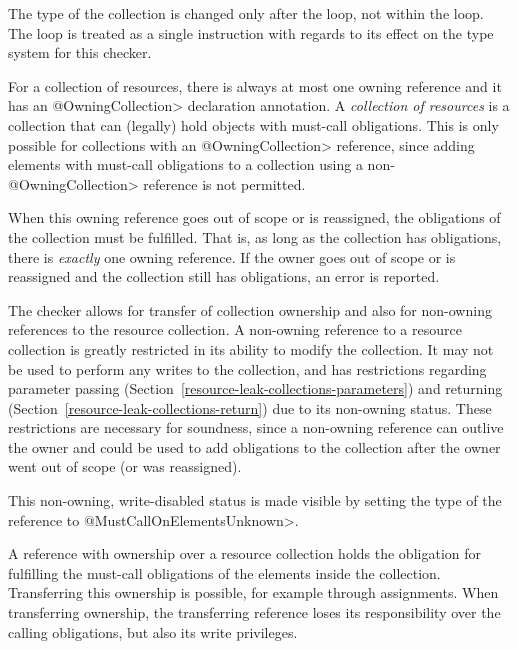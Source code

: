 The type of the collection is changed only after the loop, not within the
loop. The loop is treated as a single instruction with regards to its effect on
the type system for this checker.

For a collection of resources, there is always at most one owning reference and it has an \<@OwningCollection> declaration annotation. A \textit{collection of resources} is a collection that can (legally) hold objects with must-call obligations. This is only possible for collections with an \<@OwningCollection> reference, since adding elements with must-call obligations to a collection using a non-\<@OwningCollection> reference is not permitted.

When this owning reference goes out of scope or is reassigned, the obligations of the collection must be fulfilled. That is, as long as the collection has obligations, there is \textit{exactly} one owning reference. If the owner goes out of scope or is reassigned and the collection still has obligations, an error is reported.

The checker allows for transfer of collection ownership and also for non-owning references to the resource collection. A non-owning reference to a resource collection is greatly restricted in its ability to modify the collection. It may not be used to perform any writes to the collection, and has restrictions regarding parameter passing (Section~\ref{resource-leak-collections-parameters}) and returning (Section~\ref{resource-leak-collections-return}) due to its non-owning status. These restrictions are necessary for soundness, since a non-owning reference can outlive the owner and could be used to add obligations to the collection after the owner went out of scope (or was reassigned).

This non-owning, write-disabled status is made visible by setting the \MustCallOnElements type of the reference to
\<@MustCallOnElementsUnknown>.

A reference with ownership over a resource collection holds the obligation for fulfilling the must-call obligations of the elements inside the collection. Transferring this ownership is possible, for example through assignments. When transferring ownership, the transferring reference loses its responsibility over the calling obligations, but also its write privileges.

